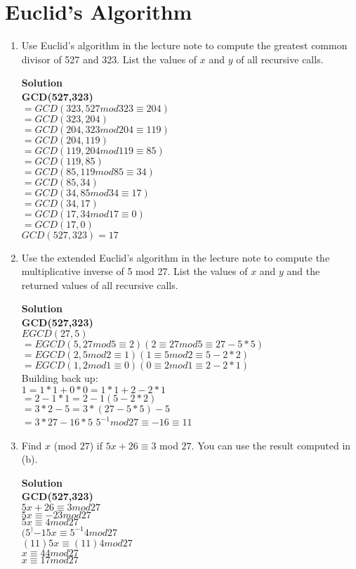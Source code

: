 \documentclass[11pt]{article}
\newcommand*{\Question}[1]{\section{#1}}
\newenvironment{Parts}{\begin{enumerate}[label=(\alph*)]}{\end{enumerate}}
\newcommand*{\Part}{\item}
\begin{document}
\Question{Euclid's Algorithm}
\begin{Parts}
\Part Use Euclid's algorithm in the lecture note to compute the greatest common divisor of 527 and 323. List the values of $x$ and $y$ of all recursive calls.
\begin{mdframed} \textbf{Solution} \\
\textbf{GCD(527,323)} \\
$=GCD(323, 527mod323 \equiv 204)$ \\
$=GCD(323, 204)$ \\
$=GCD(204, 323mod204 \equiv 119)$ \\
$=GCD(204, 119)$ \\
$=GCD(119, 204mod119 \equiv 85)$ \\
$=GCD(119, 85)$ \\
$=GCD(85, 119mod85 \equiv 34)$ \\
$=GCD(85, 34)$ \\
$=GCD(34, 85mod34 \equiv 17)$ \\
$=GCD(34, 17)$ \\
$=GCD(17, 34mod17 \equiv 0)$ \\
$=GCD(17,0)$ \\
$GCD(527, 323)=17$
\end{mdframed}

\Part Use the extended Euclid's algorithm in the lecture note to compute the multiplicative inverse of 5 mod 27. List the values of $x$ and $y$ and the returned values of all recursive calls.
\begin{mdframed} \textbf{Solution} \\
\textbf{GCD(527,323)} \\
\textbf{$EGCD(27,5)$} \\
$=EGCD(5, 27mod5 \equiv 2) (2 \equiv 27mod5 \equiv 27-5*5)$ \\
$=EGCD(2, 5mod2 \equiv 1) (1 \equiv 5mod2 \equiv 5-2*2)$ \\
$=EGCD(1, 2mod1 \equiv 0) (0 \equiv 2mod1 \equiv 2-2*1)$ \\
Building back up: \\
$1=1*1+0*0=1*1+2-2*1$ \\
$=2-1*1=2-1(5-2*2)$ \\
$=3*2-5=3*(27-5*5)-5$ \\
$=3*27-16*5$
$5^{-1}mod27 \equiv -16 \equiv 11$ 
\end{mdframed}

\pagebreak

\Part Find $x$ (mod $27$) if $5x+26\equiv 3$ mod $27$. You can use the result computed in (b).
\begin{mdframed} \textbf{Solution} \\
\textbf{GCD(527,323)} \\
\textbf{$5x+26 \equiv 3mod27$} \\
$5x \equiv -23mod27$ \\
$5x \equiv 4mod27$ \\
$(5^){-1}5x \equiv 5^{-1}4mod27$ \\
$(11)5x \equiv (11)4mod27$ \\
$x \equiv 44mod27$ \\
$x \equiv 17mod27$
\end{mdframed}


\end{Parts}
\end{document}

